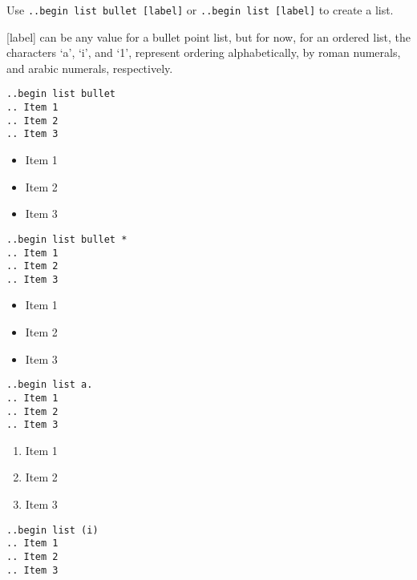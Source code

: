 \documentclass[12pt]{article}
\begin{document}
\begin{flushleft}

Use \verb|..begin list bullet [label]| or \verb|..begin list [label]| to create a list.

[label] can be any value for a bullet point list, but for now, for an ordered list, the characters `a', `i', and `1', represent ordering alphabetically, by roman numerals, and arabic numerals, respectively.

\verb|..begin list bullet|\\
\verb|.. Item 1|\\
\verb|.. Item 2|\\
\verb|.. Item 3|\\

\begin{itemize}
    \item Item 1
    \item Item 2
    \item Item 3
\end{itemize}

\verb|..begin list bullet *|\\
\verb|.. Item 1|\\
\verb|.. Item 2|\\
\verb|.. Item 3|\\

\begin{itemize}[label=*]
    \item Item 1
    \item Item 2
    \item Item 3
\end{itemize}

\verb|..begin list a.|\\
\verb|.. Item 1|\\
\verb|.. Item 2|\\
\verb|.. Item 3|\\

\begin{enumerate}[label=\alph*.]
    \item Item 1
    \item Item 2
    \item Item 3
\end{enumerate}

\verb|..begin list (i)|\\
\verb|.. Item 1|\\
\verb|.. Item 2|\\
\verb|.. Item 3|\\


\end{flushleft}
\end{document}

